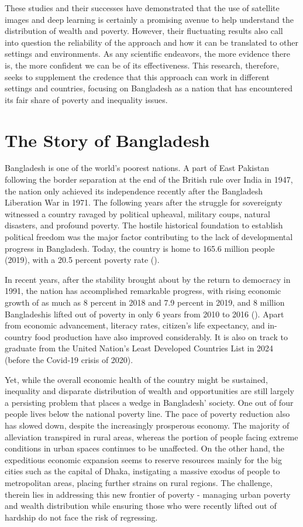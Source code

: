 \documentclass[solid,math,chem,code,plot,gloss]{bmc}
\begin{document}
These studies and their successes have demonstrated that the use of satellite images and deep learning is certainly a promising avenue to help understand the distribution of wealth and poverty. However, their fluctuating results also call into question the reliability of the approach and how it can be translated to other settings and environments. As any scientific endeavors, the more evidence there is, the more confident we can be of its effectiveness. This research, therefore, seeks to supplement the credence that this approach can work in different settings and countries, focusing on Bangladesh as a nation that has encountered its fair share of poverty and inequality issues. 

\chapter{The Story of Bangladesh}

Bangladesh is one of the world's poorest nations. A part of East Pakistan following the border separation at the end of the British rule over India in 1947, the nation only achieved its independence recently after the Bangladesh Liberation War in 1971. The following years after the struggle for sovereignty witnessed a country ravaged by political upheaval, military coups, natural disasters, and profound poverty. The hostile historical foundation to establish political freedom was the major factor contributing to the lack of developmental progress in Bangladesh. Today, the country is home to 165.6 million people (2019), with a 20.5 percent poverty rate (\cite{WB_2019}).

In recent years, after the stability brought about by the return to democracy in 1991, the nation has accomplished remarkable progress, with rising economic growth of as much as 8 percent in 2018 and 7.9 percent in 2019, and 8 million Bangladeshis lifted out of poverty in only 6 years from 2010 to 2016 (\cite{WB_2019}). Apart from economic advancement, literacy rates, citizen's life expectancy, and in-country food production have also improved considerably. It is also on track to graduate from the United Nation’s Least Developed Countries List in 2024 (before the Covid-19 crisis of 2020). 

Yet, while the overall economic health of the country might be sustained, inequality and disparate distribution of wealth and opportunities are still largely a persisting problem that places a wedge in Bangladesh' society. One out of four people lives below the national poverty line. The pace of poverty reduction also has slowed down, despite the increasingly prosperous economy. The majority of alleviation transpired in rural areas, whereas the portion of people facing extreme conditions in urban spaces continues to be unaffected. On the other hand, the expeditious economic expansion seems to reserve resources mainly for the big cities such as the capital of Dhaka, instigating a massive exodus of people to metropolitan areas, placing further strains on rural regions. The challenge, therein lies in addressing this new frontier of poverty - managing urban poverty and wealth distribution while ensuring those who were recently lifted out of hardship do not face the risk of regressing. 
\end{document}
